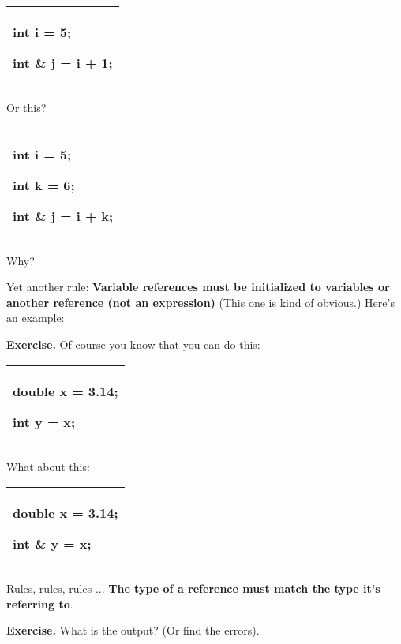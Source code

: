 \documentclass[
]{article}
\begin{document}
\begin{longtable}[]{@{}l@{}}
\toprule
\endhead
\begin{minipage}[t]{0.97\columnwidth}\raggedright
int i = 5;

int \& j = i + 1;\strut
\end{minipage}\tabularnewline
\bottomrule
\end{longtable}

Or this?

\begin{longtable}[]{@{}l@{}}
\toprule
\endhead
\begin{minipage}[t]{0.97\columnwidth}\raggedright
int i = 5;

int k = 6;

int \& j = i + k;\strut
\end{minipage}\tabularnewline
\bottomrule
\end{longtable}

Why?

Yet another rule: \textbf{Variable references must be initialized to
variables or another reference (not an expression) } (This one is kind
of obvious.) Here's an example:

\textbf{Exercise.} Of course you know that you can do this:

\begin{longtable}[]{@{}l@{}}
\toprule
\endhead
\begin{minipage}[t]{0.97\columnwidth}\raggedright
double x = 3.14;

int y = x;\strut
\end{minipage}\tabularnewline
\bottomrule
\end{longtable}

What about this:

\begin{longtable}[]{@{}l@{}}
\toprule
\endhead
\begin{minipage}[t]{0.97\columnwidth}\raggedright
double x = 3.14;

int \& y = x;\strut
\end{minipage}\tabularnewline
\bottomrule
\end{longtable}

Rules, rules, rules ... \textbf{The type of a reference must match the
type it's referring to}.

\textbf{Exercise.} What is the output? (Or find the errors).
\end{document}
